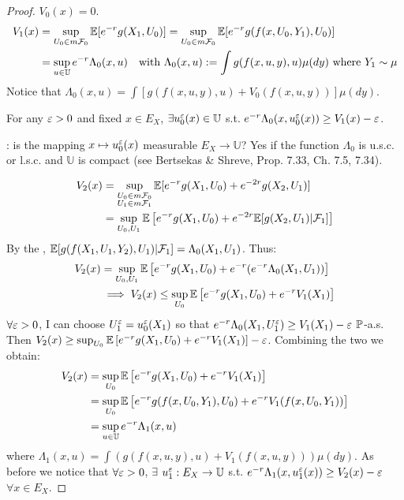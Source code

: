 \begin{proof}
    $V_0(x) = 0$.
    \begin{align*}
        V_1(x) &= \sup_{U_0 \in m\mathcal{F}_0} \mathbb E[e^{-r} g(X_1, U_0)] = \sup_{U_0 \in m\mathcal{F}_0} \mathbb E[e^{-r} g(f(x, U_0, Y_1), U_0)] \\
        &= \sup_{u \in \mathbb{U}} e^{-r} \Lambda_0(x, u) \quad \text{with } \Lambda_0(x, u) := \int g(f(x, u, y), u) \mu(dy) \text{ where } Y_1 \sim \mu
    \end{align*}
    Notice that $\Lambda_0(x, u) = \int [g(f(x, u, y), u) + V_0(f(x, u, y))] \mu(dy)$.
    
    For any $\varepsilon > 0$ and fixed $x \in E_X$, $\exists u_0^\varepsilon(x) \in \mathbb{U}$ s.t. $e^{-r} \Lambda_0(x, u_0^\varepsilon(x)) \geq V_1(x) - \varepsilon$.

    \begin{remark}
        : is the mapping $x \mapsto u_0^\varepsilon(x)$ measurable $E_X \to \mathbb{U}$? Yes if the function $\Lambda_0$ is u.s.c. or l.s.c. and $\mathbb{U}$ is compact (see Bertsekas \& Shreve, Prop. 7.33, Ch. 7.5, 7.34).
    \end{remark}

    \begin{align*}
        V_2(x) &= \sup_{\substack{U_0 \in m\mathcal{F}_0 \\ U_1 \in m\mathcal{F}_1}} \mathbb E[e^{-r} g(X_1, U_0) + e^{-2r} g(X_2, U_1)] \\
        &= \sup_{U_0, U_1} \mathbb E \left[ e^{-r} g(X_1, U_0) + e^{-2r} \mathbb E[g(X_2, U_1) | \mathcal{F}_1] \right]
    \end{align*}
    By the , $\mathbb E[g(f(X_1, U_1, Y_2), U_1) | \mathcal{F}_1] = \Lambda_0(X_1, U_1)$. Thus:
    \begin{align*}
        V_2(x) &= \sup_{U_0, U_1} \mathbb E \left[ e^{-r} g(X_1, U_0) + e^{-r} (e^{-r} \Lambda_0(X_1, U_1)) \right] \\
        &\implies V_2(x) \leq \sup_{U_0} \mathbb E \left[ e^{-r} g(X_1, U_0) + e^{-r} V_1(X_1) \right]
    \end{align*}
    $\forall \varepsilon > 0$, I can choose $U_1^\varepsilon = u_0^\varepsilon(X_1)$ so that $e^{-r} \Lambda_0(X_1, U_1^\varepsilon) \geq V_1(X_1) - \varepsilon$ $\mathbb P$-a.s.
    Then $V_2(x) \geq \sup_{U_0} \mathbb E \left[ e^{-r} g(X_1, U_0) + e^{-r} V_1(X_1) \right] - \varepsilon$.
    Combining the two we obtain:
    \begin{align*}
        V_2(x) &= \sup_{U_0} \mathbb E \left[ e^{-r} g(X_1, U_0) + e^{-r} V_1(X_1) \right] \\
        &= \sup_{U_0} \mathbb E \left[ e^{-r} g(f(x, U_0, Y_1), U_0) + e^{-r} V_1(f(x, U_0, Y_1)) \right] \\
        &= \sup_{u \in \mathbb{U}} e^{-r} \Lambda_1(x, u)
    \end{align*}
    where $\Lambda_1(x, u) = \int (g(f(x, u, y), u) + V_1(f(x, u, y))) \mu(dy)$.
    As before we notice that $\forall \varepsilon > 0$, $\exists$  $u_1^\varepsilon: E_X \to \mathbb{U}$ s.t. $e^{-r} \Lambda_1(x, u_1^\varepsilon(x)) \geq V_2(x) - \varepsilon$ $\forall x \in E_X$.


\end{proof}
